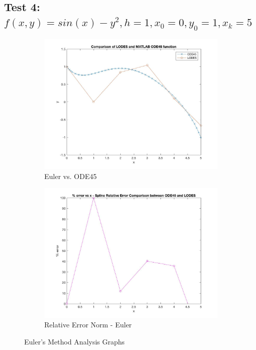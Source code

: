 \documentclass[12pt, titlepage]{article}
\begin{document}
\subsection{Test 4: $f(x,y) = sin(x) - y^2, h = 1,x_0 = 0,y_0 = 1,x_k = 5$} \label{sec_t4}
\begin{figure}[H]
\centering
\begin{subfigure}{.55\textwidth}
  \centering
  \includegraphics[width=\linewidth]{images/Test4/1LODESvsMATLABPlot.jpg}
  \caption{Euler vs. ODE45}
  \label{fig:euler4a}
\end{subfigure}%
\begin{subfigure}{.55\textwidth}
  \centering
  \includegraphics[width=\linewidth]{images/Test4/1RelativeErrorPlot.jpg}
  \caption{Relative Error Norm - Euler}
  \label{fig:euler4b}
\end{subfigure}
\caption{Euler's Method Analysis Graphs}
\label{fig:euler4}
\end{figure}
\end{document}
